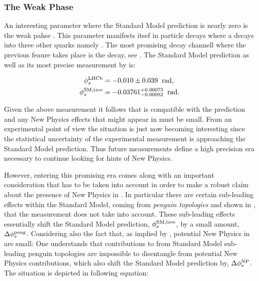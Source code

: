 \subsubsection{The Weak Phase \phis}

An interesting parameter where the Standard Model prediction is nearly zero is the weak pahse \phis.
This parameter manifests itsef in particle decays where a \bquark decays into three other quarks namely \cquark\cquarkbar\squark.
The most promising decay channell where the previous feaure takes place is the \BsJpsiPhi decay, see .
The Standard Model \phis prediction as well as its most precise measurement by \lhcb is:

\begin{subequations}
  \label{app_phis_lhcb_theo}
  \begin{align}
  \centering
  \phiS{\lhcb}           &=  -0.010 \pm 0.039  \;\; \text{rad},
  \label{app_phis_lhcb}\\
  \phiS{SM,tree}  &= -0.03761 {}^{+0.00073}_{-0.00082}  \;\; \text{rad}.
  \label{app_phis_theo}
\end{align}
\end{subequations}

\noindent Given the above measurement it follows that \phis is compatible
with the prediction and any New Physics effects that might appear in \phis must be small.
From an experimental point of view the situation is just now becoming interesting
since the statistical uncertainty of the experimental measurement is approaching the Standard
Model prediction. Thus future \phis measurements define a high precision era
necessary to continue looking for hints of New Physics.

However, entering this promising era comes along with an important consideration
that has to be taken into account in order to make a robust claim about the presence of New Physics
in \phis. In particular there are certain sub-leading effects within the Standard Model, coming from
{\it penguin topologies} and shown in , that the
\phis measurement does not take into account. These sub-leading effects essentially shift
the Standard Model prediction, $\phi_{s}^{\tiny \text{SM,tree}}$, by a small amount, $\Delta\phi_{s}^{\tiny\text{peng}}$.
Considering also the fact that, as implied by , potential New Physics in
\phis are small: One understands that contributions to \phis from Standard Model sub-leading penguin
topologies are impossible to disentangle from potential New Physics contributions, which also shift
the Standard Model prediction by, $\Delta\phi_{s}^{\tiny \text{NP}}$. The situation is depicted in
following equation:

